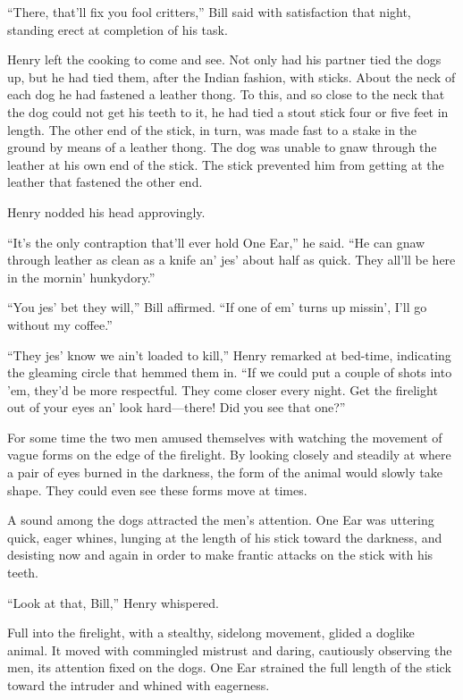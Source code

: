 \documentclass[10pt]{book}
\begin{document}
“There, that’ll fix you fool critters,” Bill said with satisfaction
that night, standing erect at completion of his task.

Henry left the cooking to come and see. Not only had his partner tied
the dogs up, but he had tied them, after the Indian fashion, with
sticks. About the neck of each dog he had fastened a leather thong. To
this, and so close to the neck that the dog could not get his teeth to
it, he had tied a stout stick four or five feet in length. The other
end of the stick, in turn, was made fast to a stake in the ground by
means of a leather thong. The dog was unable to gnaw through the
leather at his own end of the stick. The stick prevented him from
getting at the leather that fastened the other end.

Henry nodded his head approvingly.

“It’s the only contraption that’ll ever hold One Ear,” he said. “He can
gnaw through leather as clean as a knife an’ jes’ about half as quick.
They all’ll be here in the mornin’ hunkydory.”

“You jes’ bet they will,” Bill affirmed. “If one of em’ turns up
missin’, I’ll go without my coffee.”

“They jes’ know we ain’t loaded to kill,” Henry remarked at bed-time,
indicating the gleaming circle that hemmed them in. “If we could put a
couple of shots into ’em, they’d be more respectful. They come closer
every night. Get the firelight out of your eyes an’ look hard—there!
Did you see that one?”

For some time the two men amused themselves with watching the movement
of vague forms on the edge of the firelight. By looking closely and
steadily at where a pair of eyes burned in the darkness, the form of
the animal would slowly take shape. They could even see these forms
move at times.

A sound among the dogs attracted the men’s attention. One Ear was
uttering quick, eager whines, lunging at the length of his stick toward
the darkness, and desisting now and again in order to make frantic
attacks on the stick with his teeth.

“Look at that, Bill,” Henry whispered.

Full into the firelight, with a stealthy, sidelong movement, glided a
doglike animal. It moved with commingled mistrust and daring,
cautiously observing the men, its attention fixed on the dogs. One Ear
strained the full length of the stick toward the intruder and whined
with eagerness.
\end{document}

